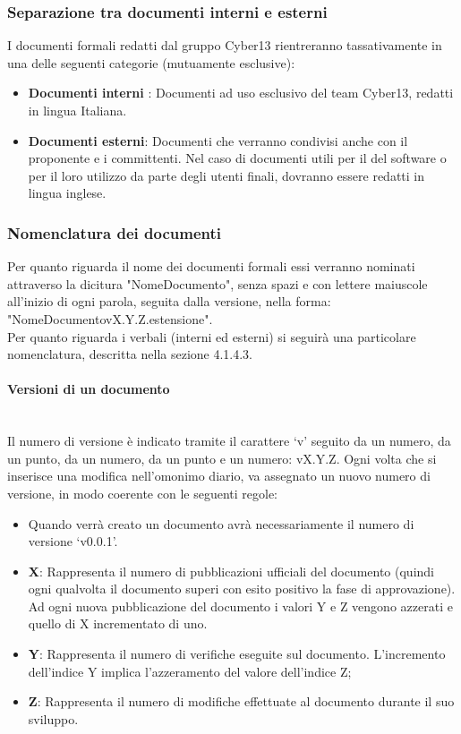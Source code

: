 \newpage
\subsubsection{Separazione tra documenti interni e esterni}
I documenti formali redatti dal gruppo Cyber13 rientreranno tassativamente in una delle seguenti categorie (mutuamente esclusive):
    \begin{itemize}
        \item \textbf{Documenti interni} : Documenti ad uso esclusivo del team Cyber13, redatti in lingua Italiana.
        \item \textbf{Documenti esterni}: Documenti che verranno condivisi anche con il proponente e i committenti. Nel caso di documenti utili per il   del software o per il loro utilizzo da parte degli utenti finali, dovranno essere redatti in lingua inglese.
    \end{itemize}

\subsubsection{Nomenclatura dei documenti}
Per quanto riguarda il nome dei documenti formali essi verranno nominati  attraverso la dicitura "NomeDocumento", senza spazi e con lettere maiuscole all'inizio di ogni parola, seguita dalla versione, nella forma: "NomeDocumento\textunderscore vX.Y.Z.estensione". \\
Per quanto riguarda i verbali (interni ed esterni) si seguirà una particolare nomenclatura, descritta nella sezione 4.1.4.3.
        
    \paragraph{Versioni di un documento} 
    ~\\
    Il numero di versione è indicato tramite il carattere ‘v’ seguito da un numero, da un punto, da un numero, da un punto e un numero: vX.Y.Z.
    Ogni volta che si inserisce una modifica nell’omonimo diario, va assegnato un nuovo numero di versione, in modo coerente con le seguenti regole:
                 \begin{itemize}
                    \item Quando verrà creato un documento avrà necessariamente il numero di versione ‘v0.0.1’.
                    \item \textbf{X}: Rappresenta il numero di pubblicazioni ufficiali del documento (quindi ogni qualvolta il documento superi con esito  positivo la fase di approvazione). Ad ogni nuova pubblicazione del documento i valori Y e Z vengono azzerati e quello di X incrementato di uno.
                     \item \textbf{Y}: Rappresenta  il  numero  di  verifiche  eseguite sul documento. L'incremento dell'indice Y implica l'azzeramento del valore dell'indice Z;
                    \item \textbf{Z}: Rappresenta il numero di modifiche effettuate al documento durante il suo sviluppo.
            \end{itemize}
